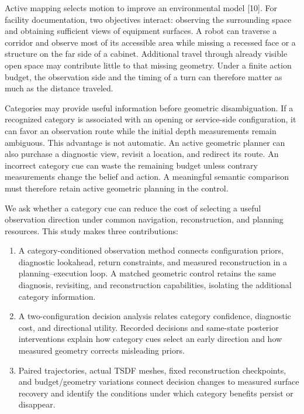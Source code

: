 \documentclass[11pt,a4paper]{article}
\providecommand{\tightlist}{\setlength{\itemsep}{0pt}\setlength{\parskip}{0pt}}
\begin{document}
Active mapping selects motion to improve an environmental model {[}10{]}. For facility documentation, two objectives interact: observing the surrounding space and obtaining sufficient views of equipment surfaces. A robot can traverse a corridor and observe most of its accessible area while missing a recessed face or a structure on the far side of a cabinet. Additional travel through already visible open space may contribute little to that missing geometry. Under a finite action budget, the observation side and the timing of a turn can therefore matter as much as the distance traveled.

Categories may provide useful information before geometric disambiguation. If a recognized category is associated with an opening or service-side configuration, it can favor an observation route while the initial depth measurements remain ambiguous. This advantage is not automatic. An active geometric planner can also purchase a diagnostic view, revisit a location, and redirect its route. An incorrect category cue can waste the remaining budget unless contrary measurements change the belief and action. A meaningful semantic comparison must therefore retain active geometric planning in the control.

We ask whether a category cue can reduce the cost of selecting a useful observation direction under common navigation, reconstruction, and planning resources. This study makes three contributions:

\begin{enumerate}
\def\labelenumi{\arabic{enumi}.}
\tightlist
\item
  A category-conditioned observation method connects configuration priors, diagnostic lookahead, return constraints, and measured reconstruction in a planning--execution loop. A matched geometric control retains the same diagnosis, revisiting, and reconstruction capabilities, isolating the additional category information.
\item
  A two-configuration decision analysis relates category confidence, diagnostic cost, and directional utility. Recorded decisions and same-state posterior interventions explain how category cues select an early direction and how measured geometry corrects misleading priors.
\item
  Paired trajectories, actual TSDF meshes, fixed reconstruction checkpoints, and budget/geometry variations connect decision changes to measured surface recovery and identify the conditions under which category benefits persist or disappear.
\end{enumerate}
\end{document}

